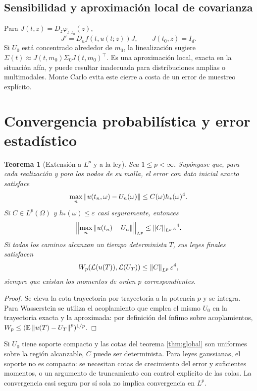\documentclass[11pt,a4paper]{article}
\newtheorem{theorem}{Teorema}[section]
\theoremstyle{definition}\newtheorem{definition}[theorem]{Definición}
\theoremstyle{remark}\newtheorem{remark}[theorem]{Observación}
\begin{document}
\subsection{Sensibilidad y aproximación local de covarianza}
Para $J(t,z)=D_z\varphi_{t,t_0}(z)$,
\[
 J'=D_uf(t,u(t;z))J,\qquad J(t_0,z)=I_d.
\]
Si $U_0$ está concentrado alrededor de $m_0$, la linealización sugiere
$\Sigma(t)\approx J(t,m_0)\Sigma_0J(t,m_0)^\top$.
Es una aproximación local, exacta en la situación afín, y puede resultar
inadecuada para distribuciones amplias o multimodales. Monte Carlo evita
este cierre a costa de un error de muestreo explícito.

\clearpage
\section{Convergencia probabilística y error estadístico}
\begin{theorem}[Extensión a $L^p$ y a la ley]\label{thm:lp}
Sea $1\leq p<\infty$. Supóngase que, para cada realización y para los nodos
de su malla, el error con dato inicial exacto satisface
\[
 \max_n\left\lVert u(t_n,\omega)-U_n(\omega)\right\rVert
 \leq C(\omega)h_*(\omega)^4.
\]
Si $C\in L^p(\Omega)$ y $h_*(\omega)\leq\varepsilon$ casi seguramente,
entonces
\[
 \left\|\max_n\left\lVert u(t_n)-U_n\right\rVert\right\|_{L^p}
 \leq\left\lVert C\right\rVert_{L^p}\varepsilon^4.
\]
Si todos los caminos alcanzan un tiempo determinista $T$, sus leyes finales
satisfacen
\[
W_p(\mathcal L(u(T)),\mathcal L(U_T))\leq\left\lVert C\right\rVert_{L^p}\varepsilon^4,
\]
siempre que existan los momentos de orden $p$ correspondientes.
\end{theorem}
\begin{proof}
Se eleva la cota trayectoria por trayectoria a la potencia $p$ y se integra.
Para Wasserstein se utiliza el acoplamiento que emplea el mismo $U_0$ en
la trayectoria exacta y la aproximada: por definición del ínfimo sobre
acoplamientos, $W_p\leq(\mathbb E\left\lVert u(T)-U_T\right\rVert^p)^{1/p}$.
\end{proof}
Si $U_0$ tiene soporte compacto y las cotas del teorema
\ref{thm:global} son uniformes sobre la región alcanzable, $C$ puede ser
determinista. Para leyes gaussianas, el soporte no es compacto: se necesitan
cotas de crecimiento del error y suficientes momentos, o un argumento de
truncamiento con control explícito de las colas. La convergencia casi segura
por sí sola no implica convergencia en $L^p$.
\end{document}
